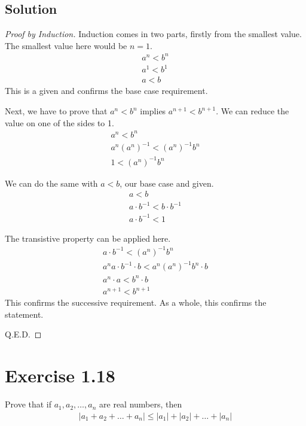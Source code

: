 \documentclass[12pt]{report}
\begin{document}
\subsection*{Solution}
\begin{proof}[Proof by Induction]
    Induction comes in two parts, firstly from the smallest value. 
    The smallest value here would be $n = 1$.
    \begin{gather}
        a^n < b^n\\
        a^1 < b^1\\
        a < b
    \end{gather}
    This is a given and confirms the base case requirement.

    Next, we have to prove that $a^n < b^n$ implies $a^{n + 1} < b^{n + 1}$.
    We can reduce the value on one of the sides to 1.
    \begin{gather}
        a^n < b^n\\
        a^n (a^n)^{-1} < (a^n)^{-1} b^n\\
        1 < (a^n)^{-1} b^n
    \end{gather}

    We can do the same with $a < b$, our base case and given.
    \begin{gather}
        a < b\\
        a \cdot b^{-1} < b \cdot b^{-1}\\
        a \cdot b^{-1} < 1
    \end{gather}

    The transistive property can be applied here.
    \begin{gather}
        a \cdot b^{-1} < (a^n)^{-1} b^n\\
        a^n a \cdot b^{-1} \cdot b < a^n (a^n)^{-1} b^n \cdot b\\
        a^n \cdot a < b^n \cdot b\\
        a^{n + 1} < b^{n + 1}
    \end{gather}
    This confirms the successive requirement.
    As a whole, this confirms the statement.

    Q.E.D.
\end{proof}

\pagebreak
\section{Exercise 1.18}
Prove that if $a_1, a_2,\dots,a_n$ are real numbers, then 
\begin{gather*}
    \left| a_1 + a_2 + \dots + a_n \right| \le \left|a_1\right| + \left|a_2\right| + \dots + \left|a_n\right|
\end{gather*}
\end{document}
